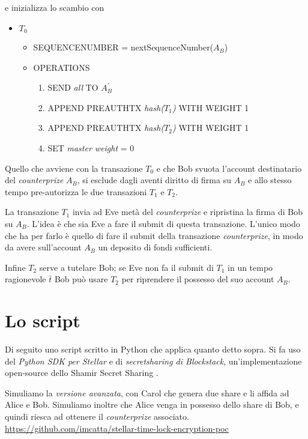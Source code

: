 e inizializza lo scambio con
\begin{itemize}
	\item $ T_0 $
	      \begin{itemize}
		      \item SEQUENCE\textunderscore NUMBER = nextSequenceNumber($ A_B $)
		      \item OPERATIONS
		            \begin{enumerate}
			            \item SEND \textit{all} TO $ A_B^{\prime} $
			            \item APPEND PRE\textunderscore AUTH\textunderscore TX
			                  \textit{hash($ T_{1} $)} WITH WEIGHT 1
			            \item APPEND PRE\textunderscore AUTH\textunderscore TX
			                  \textit{hash($ T_{2} $)} WITH WEIGHT 1
			            \item SET \textit{master weight} = 0
		            \end{enumerate}
	      \end{itemize}
\end{itemize}

Quello che avviene con la transazione $ T_0 $ e che
Bob svuota l'account destinatario del \textit{counterprize} $ A_B $, si esclude
dagli aventi diritto di firma su $ A_B $ e allo stesso tempo pre-autorizza
le due transazioni $ T_1 $ e $ T_2 $.

La transazione $ T_1 $ invia ad Eve metà del \textit{counterprize}
e ripristina la firma di Bob su $ A_B $.
L'idea è che sia Eve a fare il submit di questa transazione. L'unico modo che ha per
farlo è quello di fare il submit della transazione \textit{counterprize}, in modo da avere
sull'account $ A_B $ un deposito di fondi sufficienti.

Infine $ T_2 $ serve a tutelare Bob; se Eve non fa il submit di $ T_{1} $ in un tempo ragionevole
$ \bar{t} $ Bob può usare $ T_2 $ per riprendere il possesso del suo account $ A_B $.


\section{Lo script}
Di seguito uno script scritto in Python che applica quanto detto sopra.
Si fa uso del \textit{Python SDK per Stellar} e di
\textit{secretsharing di Blockstack}, un'implementazione open-source dello
Shamir Secret Sharing \cite{Shamir:1979:SS:359168.359176}.

Simuliamo la \textit{versione avanzata}, con Carol che genera due share e li
affida ad Alice e Bob.
Simuliamo inoltre che Alice venga in possesso dello share di Bob, e quindi riesca ad
ottenere il \textit{counterprize} associato.
\\
\url{https://github.com/imcatta/stellar-time-lock-encryption-poc}